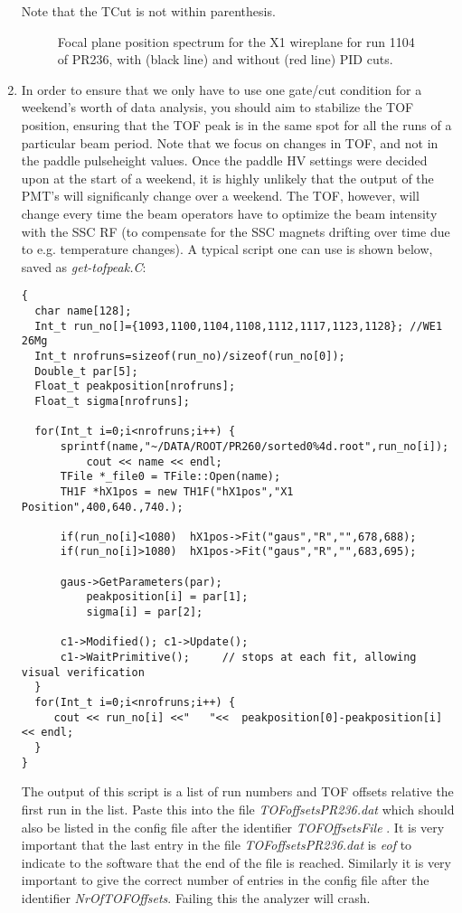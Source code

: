 \documentclass[11pt]{report}
\begin{document}
\begin{enumerate}
Note that the TCut is not within parenthesis.

\begin{figure}[]
\centerline{\vspace{0cm}\hspace{0cm}
}
\centering
\caption{Focal plane position spectrum for the X1 wireplane for run 1104 of PR236, with (black line) and 
without (red line) PID cuts.}
\label{fig:xposrun1104}
\end{figure} 


\item In order to ensure that we only have to use one gate/cut condition for a weekend's worth of data analysis,
you should aim to stabilize the TOF position, ensuring that the TOF peak is in the same spot for all the runs
of a particular beam period.
Note that we focus on changes in TOF, and not in the paddle pulseheight values.
Once the paddle HV settings were decided upon at the start of a weekend, it is highly unlikely that the output of
the PMT's will significanly change over a weekend. The TOF, however, will change every time the beam operators have to
optimize the beam intensity with the SSC RF (to compensate for the SSC magnets drifting over 
time due to e.g. temperature
changes).
A typical script one can use is shown below, saved as {\it get-tofpeak.C}:
\begin{verbatim}
{
  char name[128];
  Int_t run_no[]={1093,1100,1104,1108,1112,1117,1123,1128}; //WE1 26Mg
  Int_t nrofruns=sizeof(run_no)/sizeof(run_no[0]);   
  Double_t par[5];
  Float_t peakposition[nrofruns];
  Float_t sigma[nrofruns];

  for(Int_t i=0;i<nrofruns;i++)	{
	  sprintf(name,"~/DATA/ROOT/PR260/sorted0%4d.root",run_no[i]);
          cout << name << endl;
	  TFile *_file0 = TFile::Open(name);     
  	  TH1F *hX1pos = new TH1F("hX1pos","X1 Position",400,640.,740.);

	  if(run_no[i]<1080)  hX1pos->Fit("gaus","R","",678,688);    
	  if(run_no[i]>1080)  hX1pos->Fit("gaus","R","",683,695);    

	  gaus->GetParameters(par);
          peakposition[i] = par[1];
          sigma[i] = par[2];

	  c1->Modified(); c1->Update();
	  c1->WaitPrimitive();     // stops at each fit, allowing visual verification
  }
  for(Int_t i=0;i<nrofruns;i++)	{
     cout << run_no[i] <<"   "<<  peakposition[0]-peakposition[i]  << endl;
  }
}
\end{verbatim}
The output of this script is a list of run numbers and TOF offsets relative the first run in the list. 
Paste this into the file {\it TOFoffsetsPR236.dat}
which should also be listed in the config file after the identifier {\it TOFOffsetsFile }. It is very important that
the last entry in the file {\it TOFoffsetsPR236.dat} is {\it eof} to indicate to the software that the end of the
file is reached. Similarly it is very important to give the correct number of entries in the config file after the identifier
{\it NrOfTOFOffsets}. Failing this the analyzer will crash.


\end{enumerate}
\end{document}
